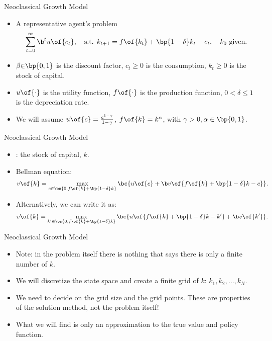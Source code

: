 \documentclass[11pt,xcolor={dvipsnames},aspectratio=159,hyperref={pdftex,pdfpagemode=UseNone,hidelinks,pdfdisplaydoctitle=true},usepdftitle=false]{beamer}
\begin{document}
\begin{frame}{Neoclassical Growth Model}
    \begin{itemize}
    \item A representative agent's problem \begin{align*}
         \sum_{t=0}^\infty \b^t u\of{c_t}, \quad \text{s.t. } k_{t+1} = f\of{k_t} + \bp{1-\delta} k_t - c_t, \quad k_0 \text{ given}.
    \end{align*}
    \item $\beta{\in}\bp{0,1}$ is the discount factor, $c_t\geq0$ is the consumption, $k_{t}\geq 0$ is the stock of capital.
    \item $u\of{\cdot}$ is the utility function, $f\of{\cdot}$ is the production function, $0<\delta\leq 1$ is the depreciation rate.
    \item We will assume $u\of{c} = \frac{c^{1-\gamma}}{1-\gamma}$, $f\of{k} = k^\alpha$, with $\gamma>0,\alpha\in\bp{0,1}$.
\end{itemize}
\end{frame}

\begin{frame}{Neoclassical Growth Model}
    \begin{itemize}
        \item {}: the stock of capital, $k$.
        \item Bellman equation: 
        \begin{align*}
            v\of{k} = \max_{c\in \bs{0,f\of{k} + \bp{1-\delta} k}} \bc{u\of{c} + \b v\of{f\of{k} + \bp{1-\delta} k - c}}.
        \end{align*}
        \item Alternatively, we can write it as:
        \begin{align*}
            v\of{k} = \max_{k'\in \bs{0, f\of{k}+\bp{1-\delta}k}} \bc{u\of{f\of{k} + \bp{1-\delta} k - k'} + \b v\of{k'}}.
        \end{align*}
\end{itemize}
\end{frame}

\begin{frame}{Neoclassical Growth Model}
    \begin{itemize}
       \item  Note: in the problem itself there is nothing that says there is only a finite number of $k$.
       \item We will discretize the state space and create a finite grid of $k$: $k_1, k_2, \ldots, k_N$.
       \item We need to decide on the grid size and the grid points. These are properties of the solution method, not the problem itself! 
       \item What we will find is only an approximation to the true value and policy function.
\end{itemize}
\end{frame}
\end{document}
